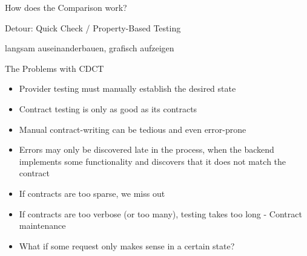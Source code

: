 \begin{frame}[fragile]{}

\end{frame}

\begin{frame}[fragile]{}

\begin{center}
{\Huge
How does the Comparison work?
}
\end{center}

\end{frame}

\begin{frame}[fragile]{Detour: Quick Check / Property-Based Testing}



\end{frame}



langsam auseinanderbauen, grafisch aufzeigen


\begin{frame}[fragile]{The Problems with CDCT}

\begin{itemize}[<+->]
\item Provider testing must manually establish the desired state
\item Contract testing is only as good as its contracts
\item Manual contract-writing can be tedious and even error-prone
\item Errors may only be discovered late in the process, when the backend implements some functionality and discovers that it does not match the contract
\item If contracts are too sparse, we miss out
\item If contracts are too verbose (or too many), testing takes too long
- Contract maintenance

\item What if some request only makes sense in a certain state?
\end{itemize}

\end{frame}

